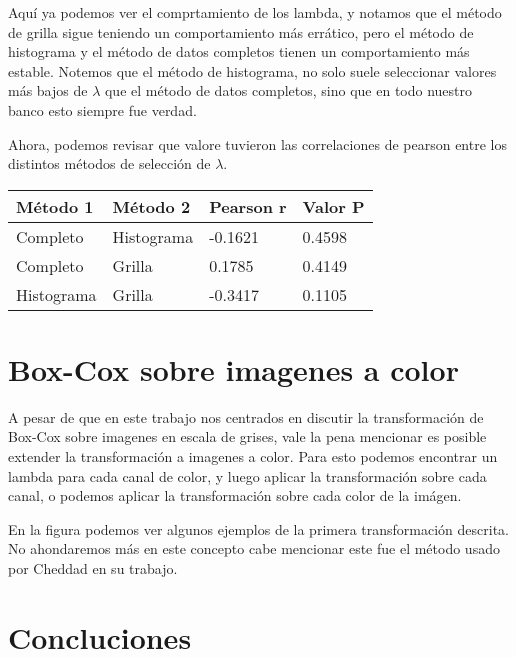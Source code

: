     Aqu\'i ya podemos ver el comprtamiento de los lambda, y notamos que el m\'etodo de grilla sigue teniendo un comportamiento m\'as err\'atico, pero el m\'etodo de histograma y el m\'etodo de datos completos tienen un comportamiento m\'as estable. Notemos que el m\'etodo de histograma, no solo suele seleccionar valores m\'as bajos de $\lambda$ que el m\'etodo de datos completos, sino que en todo nuestro banco esto siempre fue verdad.

    Ahora, podemos revisar que valore tuvieron las correlaciones de pearson entre los distintos m\'etodos de selecci\'on de $\lambda$.


    \begin{table}[H]
        \begin{tabular}{|l|l|l|l|}
            \hline
            M\'etodo 1 & M\'etodo 2 & Pearson r & Valor P \\ \hline
            Completo                  & Histograma                & -0.1621   & 0.4598  \\ 
            Completo                  & Grilla                    & 0.1785    & 0.4149  \\ 
            Histograma                & Grilla                    & -0.3417   & 0.1105  \\ \hline
        \end{tabular}
    \end{table}


    \section{Box-Cox sobre imagenes a color}

    A pesar de que en este trabajo nos centrados en discutir la transformaci\'on de Box-Cox sobre imagenes en escala de grises, vale la pena mencionar es posible extender la transformaci\'on a imagenes a color. Para esto podemos encontrar un lambda para cada canal de color, y luego aplicar la transformaci\'on sobre cada canal, o podemos aplicar la transformaci\'on sobre cada color de la im\'agen. 


    En la figura podemos ver algunos ejemplos de la primera transformaci\'on descrita.  No ahondaremos m\'as en este concepto cabe mencionar este fue el m\'etodo usado por Cheddad \cite{boxcoximg} en su trabajo.

    \section{Concluciones}